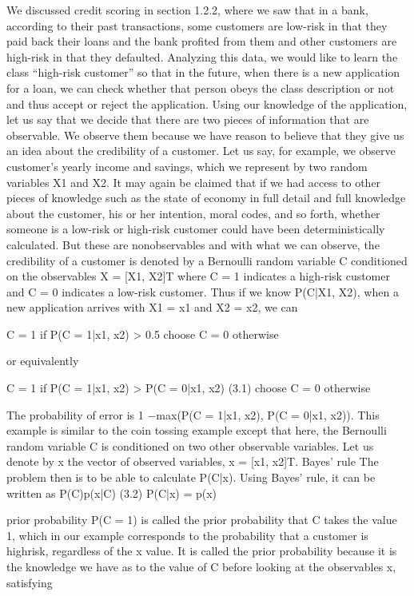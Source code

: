 We discussed credit scoring in section 1.2.2, where we saw that in a bank, according to their past transactions, some customers are low-risk in that they paid back their loans and the bank profited from them and other customers are high-risk in that they defaulted. Analyzing this data, we would like to learn the class “high-risk customer” so that in the future, when there is a new application for a loan, we can check whether that person obeys the class description or not and thus accept or reject the application. Using our knowledge of the application, let us say that we decide that there are two pieces of information that are observable. We observe them because we have reason to believe that they give us an idea about the credibility of a customer. Let us say, for example, we observe customer’s yearly income and savings, which we represent by two random variables X1 and X2. It may again be claimed that if we had access to other pieces of knowledge such as the state of economy in full detail and full knowledge about the customer, his or her intention, moral codes, and so forth, whether someone is a low-risk or high-risk customer could have been deterministically calculated. But these are nonobservables and with what we can observe, the credibility of a customer is denoted by a Bernoulli random variable C conditioned on the observables X = [X1, X2]T where C = 1 indicates a high-risk customer and C = 0 indicates a low-risk customer. Thus if we know P(C|X1, X2), when a new application arrives with X1 = x1 and X2 = x2, we can

C = 1 if P(C = 1|x1, x2) > 0.5 choose C = 0 otherwise

or equivalently

C = 1 if P(C = 1|x1, x2) > P(C = 0|x1, x2) (3.1) choose C = 0 otherwise

The probability of error is 1 $-$max(P(C = 1|x1, x2), P(C = 0|x1, x2)). This example is similar to the coin tossing example except that here, the Bernoulli random variable C is conditioned on two other observable variables. Let us denote by x the vector of observed variables, x = [x1, x2]T. Bayes’ rule The problem then is to be able to calculate P(C|x). Using Bayes’ rule, it can be written as P(C)p(x|C) (3.2) P(C|x) = p(x)

prior probability P(C = 1) is called the prior probability that C takes the value 1, which in our example corresponds to the probability that a customer is highrisk, regardless of the x value. It is called the prior probability because it is the knowledge we have as to the value of C before looking at the observables x, satisfying

